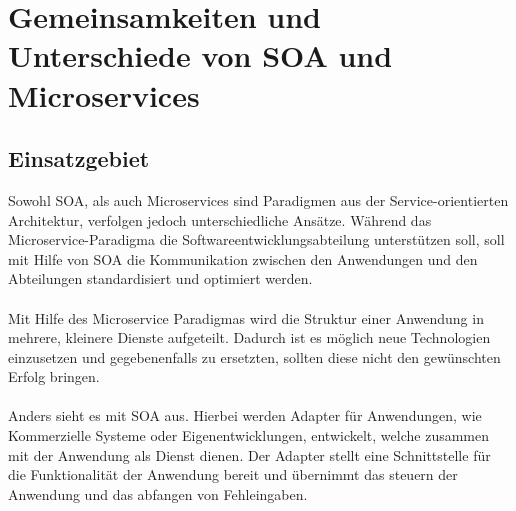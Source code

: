 \chapter[Gemeinsamkeiten und Unterschiede]{Gemeinsamkeiten und Unterschiede von SOA und Microservices}
\label{chap:Unterschiede}

\section{Einsatzgebiet}
\label{sec:Einsatzgebiet}
Sowohl SOA, als auch Microservices sind Paradigmen aus der Service-orientierten Architektur, verfolgen jedoch unterschiedliche Ansätze. Während das Microservice-Paradigma die Softwareentwicklungsabteilung unterstützen soll, soll mit Hilfe von SOA die Kommunikation zwischen den Anwendungen und den Abteilungen standardisiert und optimiert werden.
\\\\
Mit Hilfe des Microservice Paradigmas wird die Struktur einer Anwendung in mehrere, kleinere Dienste aufgeteilt. Dadurch ist es möglich neue Technologien einzusetzen und gegebenenfalls zu ersetzten, sollten diese nicht den gewünschten Erfolg bringen.
\\\\
Anders sieht es mit SOA aus. Hierbei werden Adapter für Anwendungen, wie Kommerzielle Systeme oder Eigenentwicklungen, entwickelt, welche zusammen mit der Anwendung als Dienst dienen. Der Adapter stellt eine Schnittstelle für die Funktionalität der Anwendung bereit und übernimmt das steuern der Anwendung und das abfangen von Fehleingaben.


